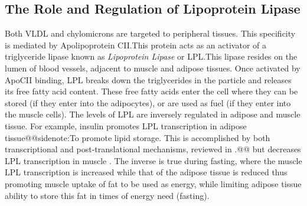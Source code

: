 \documentclass{tufte-handout}
\makeatletter
\def\sidenote#1{@@sidenote:#1@@}
\makeatother
\begin{document}
\subsection{The Role and Regulation of Lipoprotein Lipase}

Both VLDL and chylomicrons are targeted to peripheral tissues.  This specificity is mediated by Apolipoprotein CII.\@  This protein acts as an activator of a triglyceride lipase known as \emph{Lipoprotein Lipase} or LPL.\@  This lipase resides on the lumen of blood vessels, adjacent to muscle and adipose tissues.  Once activated by ApoCII binding, LPL breaks down the triglycerides in the particle and releases its free fatty acid content.  These free fatty acids enter the cell where they can be stored (if they enter into the adipocytes), or are used as fuel (if they enter into the muscle cells).  The levels of LPL are inversely regulated in adipose and muscle tissue. For example, insulin promotes LPL transcription in adipose tissue\sidenote{To promote lipid storage.  This is accomplished by both transcriptional and post-translational mechanisms, reviewed in \citet{Kersten2014}.} but decreases LPL transcription in muscle \citep{Spooners1979}.  The inverse is true during fasting, where the muscle LPL transcription is increased while that of the adipose tissue is reduced thus promoting muscle uptake of fat to be used as energy, while limiting adipose tissue ability to store this fat in times of energy need (fasting). 
\end{document}
